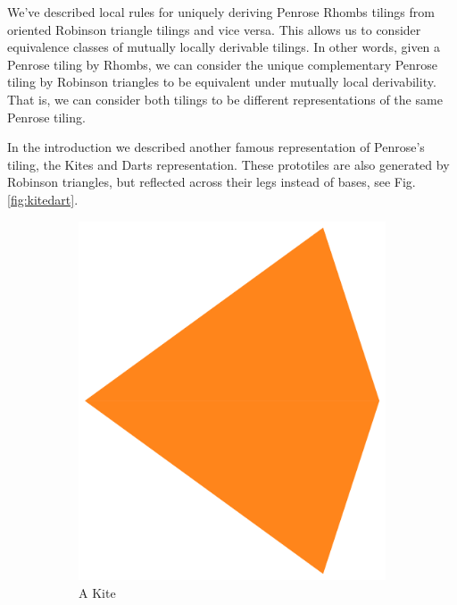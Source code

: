 \documentclass[
  oneside,
  11pt, a4paper,
  footinclude=true,
  headinclude=true,
  cleardoublepage=empty
]{scrbook}
\begin{document}
We've described local rules for uniquely deriving Penrose Rhombs tilings from oriented Robinson triangle tilings and vice versa. This allows us to consider equivalence classes of mutually locally derivable tilings. In other words, given a Penrose tiling by Rhombs, we can consider the unique complementary Penrose tiling by Robinson triangles to be equivalent under mutually local derivability. That is, we can consider both tilings to be different representations of the same Penrose tiling.

In the introduction we described another famous representation of Penrose's tiling, the Kites and Darts representation. These prototiles are also generated by Robinson triangles, but reflected across their legs instead of bases, see Fig.\ref{fig:kitedart}.

\begin{figure}[H]
\centering
\begin{subfigure}[t]{0.25\textwidth}
\includegraphics[width=\textwidth]{kite}
\caption{A Kite}
\end{subfigure}\quad\quad\quad
\begin{subfigure}[t]{0.2\textwidth}

\end{subfigure}
\end{figure}
\end{document}

